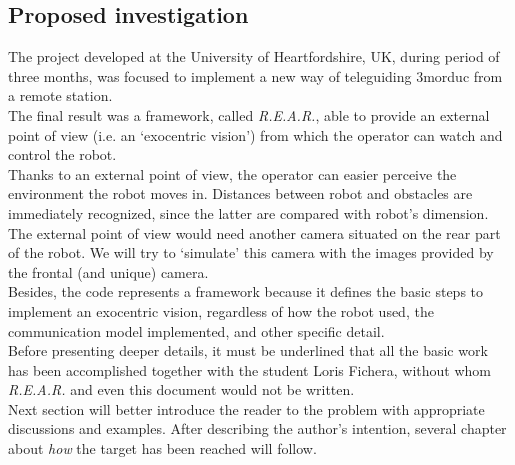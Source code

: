 \subsection{Proposed investigation}
\label{sec:proposed_investigation}

The project developed at the University of Heartfordshire,
UK, during period of three months, was focused to implement
a new way of teleguiding 3morduc from a remote station.
\\
The final result was a framework, called \textit{R.E.A.R.},
able to provide an external point of view (i.e. an `exocentric
vision') from which the operator
can watch and control the robot.
\\
Thanks to an external point of view, the operator can easier
perceive the environment the robot moves in. Distances between
robot and obstacles are immediately recognized, since the latter
are compared with robot's dimension.
\\
The external point of view would need another camera situated
on the rear part of the robot. We will try to `simulate' this
camera with the images provided by the frontal (and unique)
camera.
\\
Besides, the code represents a framework because it defines the basic
steps to implement an exocentric vision, regardless of how the
robot used, the communication model implemented, and other
specific detail.
\\
Before presenting deeper details, it must be underlined that
all the basic work has been accomplished together with the
student Loris Fichera, without whom \textit{R.E.A.R.} and even
this document would not be written.
\\
Next section will better introduce the reader to the problem with
appropriate discussions and examples. After describing
the author's intention, several chapter about \textit{how} the
target has been reached will follow.

